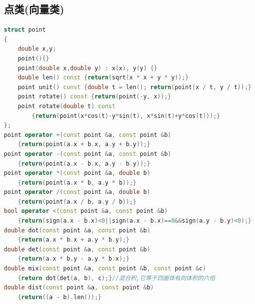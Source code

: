 \documentclass[landscape,a4paper]{article}
\begin{document}
\begin{spacing}{0.3}
\begin{multicols}{2}
\subsection{点类(向量类)}
\begin{lstlisting}[language=C++]
struct point
{
	double x,y;
	point(){}
	point(double x,double y) : x(x), y(y) {}
	double len() const {return(sqrt(x * x + y * y));}
	point unit() const {double t = len(); return(point(x / t, y / t));}
	point rotate() const {return(point(-y, x));}
	point rotate(double t) const
        {return(point(x*cos(t)-y*sin(t), x*sin(t)+y*cos(t)));}
};
point operator +(const point &a, const point &b)
    {return(point(a.x + b.x, a.y + b.y));}
point operator -(const point &a, const point &b)
    {return(point(a.x - b.x, a.y - b.y));}
point operator *(const point &a, double b)
    {return(point(a.x * b, a.y * b));}
point operator /(const point &a, double b)
    {return(point(a.x / b, a.y / b));}
bool operator <(const point &a, const point &b)
    {return(sign(a.x - b.x)<0||sign(a.x - b.x)==0&&sign(a.y - b.y)<0);}
double dot(const point &a, const point &b)
    {return(a.x * b.x + a.y * b.y);}
double det(const point &a, const point &b)
    {return(a.x * b.y - a.y * b.x);}
double mix(const point &a, const point &b, const point &c)　
    {return dot(det(a, b), c);}//混合积,它等于四面体有向体积的六倍
double dist(const point &a, const point &b)
    {return((a - b).len());}
\end{lstlisting}

\end{multicols}
\end{spacing}
\end{document}
